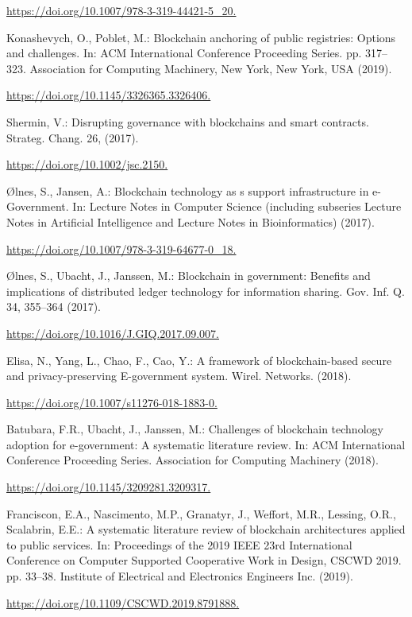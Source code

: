 \begin{multicols}{2}
\begin{thebibliography}{99}
\url{https://doi.org/10.1007/978-3-319-44421-5_20.}

 Konashevych, O., Poblet, M.: Blockchain anchoring of public registries: Options and challenges. In: ACM International Conference Proceeding Series. pp. 317–323. Association for Computing Machinery, New York, New York, USA (2019). 

\url{https://doi.org/10.1145/3326365.3326406.}

 Shermin, V.: Disrupting governance with blockchains and smart contracts. Strateg. Chang. 26, (2017). 

\url{https://doi.org/10.1002/jsc.2150.}

 Ølnes, S., Jansen, A.: Blockchain technology as s support infrastructure in e-Government. In: Lecture Notes in Computer Science (including subseries Lecture Notes in Artificial Intelligence and Lecture Notes in Bioinformatics) (2017). 

\url{https://doi.org/10.1007/978-3-319-64677-0_18.}

 Ølnes, S., Ubacht, J., Janssen, M.: Blockchain in government: Benefits and implications of distributed ledger technology for information sharing. Gov. Inf. Q. 34, 355–364 (2017).

\url{https://doi.org/10.1016/J.GIQ.2017.09.007.}

	Elisa, N., Yang, L., Chao, F., Cao, Y.: A framework of blockchain-based secure and privacy-preserving E-government system. Wirel. Networks. (2018).
 
\url{https://doi.org/10.1007/s11276-018-1883-0.}

	Batubara, F.R., Ubacht, J., Janssen, M.: Challenges of blockchain technology adoption for e-government: A systematic literature review. In: ACM International Conference Proceeding Series. Association for Computing Machinery (2018).
 
\url{https://doi.org/10.1145/3209281.3209317.}

 Franciscon, E.A., Nascimento, M.P., Granatyr, J., Weffort, M.R., Lessing, O.R., Scalabrin, E.E.: A systematic literature review of blockchain architectures applied to public services. In: Proceedings of the 2019 IEEE 23rd International Conference on Computer Supported Cooperative Work in Design, CSCWD 2019. pp. 33–38. Institute of Electrical and Electronics Engineers Inc. (2019).

\url{https://doi.org/10.1109/CSCWD.2019.8791888.}
 

\end{thebibliography}
\end{multicols}
